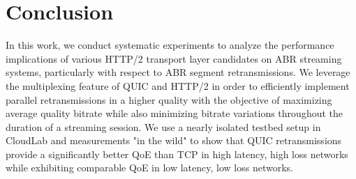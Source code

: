 \section{Conclusion}
In this work, we conduct systematic experiments to analyze the performance implications of various HTTP/2 transport layer candidates on ABR streaming systems, particularly with respect to ABR segment retransmissions. We leverage the multiplexing feature of QUIC and HTTP/2 in order to efficiently implement parallel retransmissions in a higher quality with the objective of maximizing average quality bitrate while also minimizing bitrate variations throughout the duration of a streaming session. We use a nearly isolated testbed setup in CloudLab and measurements "in the wild" to show that QUIC retransmissions provide a significantly better QoE than TCP in high latency, high loss networks while exhibiting comparable QoE in low latency, low loss networks.
\label{sec:conc}
